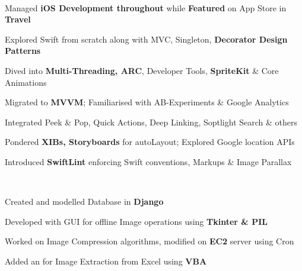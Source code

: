 \documentclass[]{Kauts}
\begin{document}
\begin{minipage}[t]{0.69\textwidth}
\\
\begin{tightemize}
\item Managed \textbf{iOS Development throughout} while \textbf{Featured} on App Store in \textbf{Travel}\\
\item Explored Swift from scratch along with MVC, Singleton, \textbf{Decorator Design Patterns}\\
\item Dived into \textbf{Multi-Threading, ARC}, Developer Tools, \textbf{SpriteKit} \& Core Animations\\
\item Migrated to \textbf{MVVM}; Familiarised with AB-Experiments \& Google Analytics\\
\item Integrated Peek \& Pop, Quick Actions, Deep Linking, Soptlight Search \& others\\
\item Pondered \textbf{XIBs, Storyboards} for autoLayout; Explored Google location APIs\\
\item Introduced \textbf{SwiftLint} enforcing Swift conventions, Markups \& Image Parallax\\
\end{tightemize}
\sectionsep

\\
\begin{tightemize}
\item Created  and modelled Database in \textbf{Django}\\
\item Developed  with GUI for offline Image operations using \textbf{Tkinter \& PIL}\\
\item Worked on Image Compression algorithms, modified on \textbf{EC2} server using Cron\\
\item Added an  for Image Extraction from Excel using \textbf{VBA}
\end{tightemize}


\end{minipage}
\end{document}
